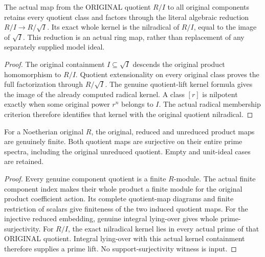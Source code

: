 \begin{theorem}
\label{algebra:original-quotient-component-kernel}
\leanok
{}
The actual map from the ORIGINAL quotient $R/I$ to all original components
retains every quotient class and factors through the literal algebraic
reduction $R/I\to R/\sqrt I$. Its exact whole kernel is the nilradical
of $R/I$, equal to the image of $\sqrt I$. This reduction is an actual
ring map, rather than replacement of any separately supplied model ideal.
\end{theorem}
\begin{proof}
The original containment $I\subseteq\sqrt I$ descends the original
product homomorphism to $R/I$. Quotient extensionality on every original
class proves the full factorization through $R/\sqrt I$. The genuine
quotient-lift kernel formula gives the image of the already computed
radical kernel. A class $[r]$ is nilpotent exactly when some original
power $r^n$ belongs to $I$. The actual radical membership criterion
therefore identifies that kernel with the original quotient nilradical.
\end{proof}

\begin{theorem}
\label{algebra:finite-component-quotient-covers}
\leanok
{}
For a Noetherian original $R$, the original, reduced and unreduced
product maps are genuinely finite. Both quotient maps are surjective on
their entire prime spectra, including the original unreduced quotient.
Empty and unit-ideal cases are retained.
\end{theorem}
\begin{proof}
Every genuine component quotient is a finite $R$-module. The actual
finite component index makes their whole product a finite module for
the original product coefficient action. Its complete quotient-map
diagrams and finite restriction of scalars give finiteness of the two
induced quotient maps. For the injective reduced embedding, genuine
integral lying-over gives whole prime-surjectivity. For $R/I$, the
exact nilradical kernel lies in every actual prime of that ORIGINAL
quotient. Integral lying-over with this actual kernel containment
therefore supplies a prime lift. No support-surjectivity witness is input.
\end{proof}

